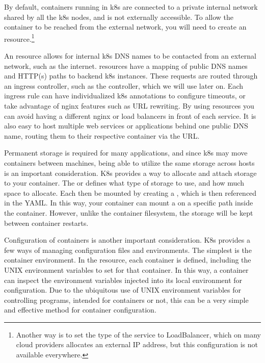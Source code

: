 \documentclass[11pt,twoside]{article}
\begin{document}
By default, containers running in k8s are connected to a private internal network shared by all
the k8s nodes, and is not externally accessible.  To allow the container to be reached
from the external network, you will need to create an  resource.\footnote{
Another way is to set the type of the service to LoadBalancer, which on many
cloud providers allocates an external IP address, but this configuration is not available
everywhere.}

An  resource allows for internal k8s DNS names to be contacted from an external network,
such as the internet.   resources have a mapping of public DNS names and HTTP(s) paths
to backend k8s  instances.  These requests are routed through an ingress
controller, such as the  controller, which we will use later on.
Each ingress rule can have individualized k8s annotations to configure timeouts,
or take advantage of nginx features such as URL rewriting.  By using  resources you can
avoid having a different nginx or load balancers in front of each service.
It is also easy to host multiple web services or applications behind one public DNS name,
routing them to their respective container via the URL.

Permanent storage is required for many applications, and since k8s may move containers
between machines, being able to utilize the same storage across hosts is an important
consideration.  K8s provides a way to allocate and attach storage to your container.
The  or  defines what type of storage to use, and how
much space to allocate.  Each  then be mounted by creating a , which is then referenced in the  YAML.  In this way, your
container can mount a  on a specific path inside the container.
However, unlike the container filesystem, the 
storage will be kept between container restarts.

Configuration of containers is another important consideration.  K8s provides a few ways of
managing configuration files and environments.  The
simplest is the container environment.  In the  resource, each container
is defined, including the UNIX environment variables to set for that container.  In this
way, a container can inspect the environment variables injected into its local environment
for configuration.  Due to the ubiquitous use of UNIX environment variables for controlling
programs, intended for containers or not, this can be a very simple and effective method
for container configuration.
\end{document}
